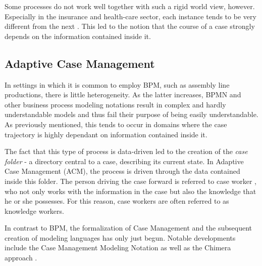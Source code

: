 Some processes do not work well together with such a rigid world view, however. Especially in the insurance and health-care sector, each instance tends to be very different from the next \cite{hewelt2016}. This led to the notion that the course of a case strongly depends on the information contained inside it.

\subsection{Adaptive Case Management}
In settings in which it is common to employ BPM, such as assembly line productions, there is little heterogeneity. As the latter increases, BPMN and other business process modeling notations result in complex and hardly understandable models and thus fail their purpose of being easily understandable. As previously mentioned, this tends to occur in domains where the case trajectory is highly dependant on information contained inside it.

The fact that this type of process is data-driven led to the creation of the \textit{case folder} - a directory central to a case, describing its current state. In Adaptive Case Management (ACM), the process is driven through the data contained inside this folder. The person driving the case forward is referred to case worker \cite{drucker1999}, who not only works with the information in the case but also the knowledge that he or she possesses. For this reason, case workers are often referred to as knowledge workers.

In contrast to BPM, the formalization of Case Management and the subsequent creation of modeling languages has only just begun. Notable developments include the Case Management Modeling Notation \cite{web:cmmn} as well as the Chimera approach \cite{hewelt2016}.

